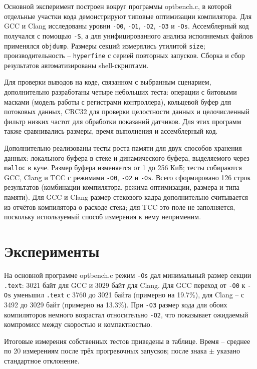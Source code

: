 \documentclass[a4paper]{article}
\begin{document}
Основной эксперимент построен вокруг программы optbench.c, в которой отдельные участки кода демонстрируют типовые оптимизации компилятора. Для GCC и Clang исследованы уровни \texttt{-O0}, \texttt{-O1}, \texttt{-O2}, \texttt{-O3} и \texttt{-Os}. Ассемблерный код получался с помощью \texttt{-S}, а для унифицированного анализа исполняемых файлов применялся \texttt{objdump}. Размеры секций измерялись утилитой \texttt{size}; производительность -- \texttt{hyperfine} с серией повторных запусков. Сборка и сбор результатов автоматизированы shell-скриптами.

Для проверки выводов на коде, связанном с выбранным сценарием, дополнительно разработаны четыре небольших теста: операции с битовыми масками (модель работы с регистрами контроллера), кольцевой буфер для потоковых данных, CRC32 для проверки целостности данных и целочисленный фильтр низких частот для обработки показаний датчиков. Для этих программ также сравнивались размеры, время выполнения и ассемблерный код.

Дополнительно реализованы тесты роста памяти для двух способов хранения данных: локального буфера в стеке и динамического буфера, выделяемого через \texttt{malloc} в куче. Размер буфера изменяется от 1 до 256 КиБ; тесты собираются GCC, Clang и TCC с режимами \texttt{-O0}, \texttt{-O2} и \texttt{-Os}. Всего сформировано 126 строк результатов (комбинации компилятора, режима оптимизации, размера и типа памяти). Для GCC и Clang размер стекового кадра дополнительно считывается из отчётов компилятора о расходе стека; для TCC это поле не заполняется, поскольку используемый способ измерения к нему неприменим.

\section{Эксперименты}

На основной программе optbench.c режим \texttt{-Os} дал минимальный размер секции \texttt{.text}: 3021 байт для GCC и 3029 байт для Clang. Для GCC переход от \texttt{-O0} к \texttt{-Os} уменьшил \texttt{.text} с 3760 до 3021 байта (примерно на 19.7\%), для Clang -- с 3492 до 3029 байт (примерно на 13.3\%). При \texttt{-O3} размер кода для обоих компиляторов немного возрастал относительно \texttt{-O2}, что показывает ожидаемый компромисс между скоростью и компактностью.

Итоговые измерения собственных тестов приведены в таблице. Время -- среднее по 20 измерениям после трёх прогревочных запусков; после знака $\pm$ указано стандартное отклонение.
\end{document}

